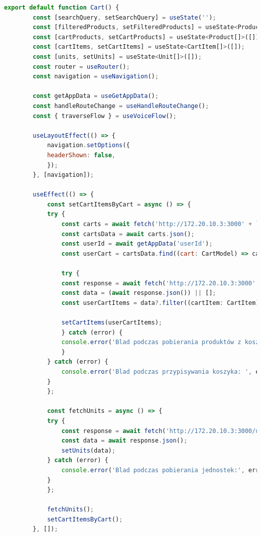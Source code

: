 \begin{lstlisting}[language=JavaScript, caption=Koszyk użytkownika implementacja, label=lst:cart_view]
    export default function Cart() {
        const [searchQuery, setSearchQuery] = useState('');
        const [filteredProducts, setFilteredProducts] = useState<Product[]>([]);
        const [cartProducts, setCartProducts] = useState<Product[]>([]);
        const [cartItems, setCartItems] = useState<CartItem[]>([]);
        const [units, setUnits] = useState<Unit[]>([]);
        const router = useRouter();
        const navigation = useNavigation();

        const getAppData = useGetAppData();
        const handleRouteChange = useHandleRouteChange();
        const { traverseFlow } = useVoiceFlow();

        useLayoutEffect(() => {
            navigation.setOptions({
            headerShown: false,
            });
        }, [navigation]);

        useEffect(() => {
            const setCartItemsByCart = async () => {
            try {
                const carts = await fetch('http://172.20.10.3:3000' + `/carts`);
                const cartsData = await carts.json();
                const userId = await getAppData('userId');
                const userCart = cartsData.find((cart: CartModel) => cart.user_id === userId);

                try {
                const response = await fetch('http://172.20.10.3:3000' + `/cart-items`);
                const data = (await response.json()) || [];
                const userCartItems = data?.filter((cartItem: CartItem) => cartItem?.cart_id === userCart?.cart_id);

                setCartItems(userCartItems);
                } catch (error) {
                console.error('Blad podczas pobierania produktów z koszyka:', error);
                }
            } catch (error) {
                console.error('Blad podczas przypisywania koszyka: ', error);
            }
            };

            const fetchUnits = async () => {
            try {
                const response = await fetch('http://172.20.10.3:3000/units');
                const data = await response.json();
                setUnits(data);
            } catch (error) {
                console.error('Blad podczas pobierania jednostek:', error);
            }
            };

            fetchUnits();
            setCartItemsByCart();
        }, []);


\end{lstlisting}
